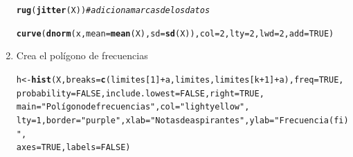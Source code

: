 \documentclass[12pt,letterpaper]{article}\usepackage[]{graphicx}\usepackage[]{color}
\makeatletter
\newcommand{\hlnum}[1]{\textcolor[rgb]{0.686,0.059,0.569}{#1}}%
\newcommand{\hlstr}[1]{\textcolor[rgb]{0.192,0.494,0.8}{#1}}%
\newcommand{\hlcom}[1]{\textcolor[rgb]{0.678,0.584,0.686}{\textit{#1}}}%
\newcommand{\hlopt}[1]{\textcolor[rgb]{0,0,0}{#1}}%
\newcommand{\hlstd}[1]{\textcolor[rgb]{0.345,0.345,0.345}{#1}}%
\newcommand{\hlkwb}[1]{\textcolor[rgb]{0.69,0.353,0.396}{#1}}%
\newcommand{\hlkwc}[1]{\textcolor[rgb]{0.333,0.667,0.333}{#1}}%
\newcommand{\hlkwd}[1]{\textcolor[rgb]{0.737,0.353,0.396}{\textbf{#1}}}%
\newenvironment{kframe}{%
 \def\at@end@of@kframe{}%
 \ifinner\ifhmode%
  \def\at@end@of@kframe{\end{minipage}}%
  \begin{minipage}{\columnwidth}%
 \fi\fi%
 \def\FrameCommand##1{\hskip\@totalleftmargin \hskip-\fboxsep
 \colorbox{shadecolor}{##1}\hskip-\fboxsep
     \hskip-\linewidth \hskip-\@totalleftmargin \hskip\columnwidth}%
 \MakeFramed {\advance\hsize-\width
   \@totalleftmargin\z@ \linewidth\hsize
   \@setminipage}}%
 {\par\unskip\endMakeFramed%
 \at@end@of@kframe}
\newenvironment{knitrout}{}{} %
\makeatother
\begin{document}
\begin{enumerate}
\begin{knitrout}
\begin{kframe}
{\ttfamily\noindent\bfseries{}}\begin{alltt}
\hlkwd{rug}\hlstd{(}\hlkwd{jitter}\hlstd{(X))} \hlcom{# adiciona marcas de los datos }
\end{alltt}


{\ttfamily\noindent\color{warningcolor}{\#\# Warning in rug(jitter(X)): some values will be clipped}}

{\ttfamily\noindent\bfseries\color{errorcolor}{\#\# Error in axis(side = side, at = at, labels = labels, ...): plot.new has not been called yet}}\begin{alltt}
\hlkwd{curve}\hlstd{(}\hlkwd{dnorm}\hlstd{(x,} \hlkwc{mean}\hlstd{=}\hlkwd{mean}\hlstd{(X),} \hlkwc{sd}\hlstd{=}\hlkwd{sd}\hlstd{(X)),} \hlkwc{col} \hlstd{=} \hlnum{2}\hlstd{,} \hlkwc{lty} \hlstd{=} \hlnum{2}\hlstd{,}\hlkwc{lwd} \hlstd{=} \hlnum{2}\hlstd{,} \hlkwc{add} \hlstd{=} \hlnum{TRUE}\hlstd{)}
\end{alltt}


{\ttfamily\noindent\bfseries\color{errorcolor}{\#\# Error in plot.xy(xy.coords(x, y), type = type, ...): plot.new has not been called yet}}\end{kframe}
\end{knitrout}

\item Crea el pol\'igono de frecuencias
\begin{knitrout}
\color{fgcolor}\begin{kframe}
\begin{alltt}
\hlstd{h}\hlkwb{<-} \hlkwd{hist}\hlstd{(X,} \hlkwc{breaks}\hlstd{=}\hlkwd{c}\hlstd{(limites[}\hlnum{1}\hlstd{]}\hlopt{+}\hlstd{a, limites, limites[k}\hlopt{+}\hlnum{1}\hlstd{]}\hlopt{+}\hlstd{a),} \hlkwc{freq} \hlstd{=}\hlnum{TRUE}\hlstd{,}
          \hlkwc{probability}\hlstd{=}\hlnum{FALSE} \hlstd{,} \hlkwc{include.lowest}\hlstd{=}\hlnum{FALSE} \hlstd{,} \hlkwc{right}\hlstd{=}\hlnum{TRUE}\hlstd{,}
\hlkwc{main} \hlstd{=} \hlstr{"Polígono de frecuencias"}\hlstd{,}\hlkwc{col}\hlstd{=}\hlstr{"lightyellow"}\hlstd{,}
\hlkwc{lty}\hlstd{=}\hlnum{1}\hlstd{,} \hlkwc{border} \hlstd{=} \hlstr{"purple"} \hlstd{,} \hlkwc{xlab}\hlstd{=}\hlstr{" Notas de aspirantes"} \hlstd{,} \hlkwc{ylab}\hlstd{=}\hlstr{"Frecuencia (fi)"}\hlstd{,}
\hlkwc{axes}\hlstd{=}\hlnum{TRUE}\hlstd{,} \hlkwc{labels}\hlstd{=}\hlnum{FALSE}\hlstd{)}
\end{alltt}



\end{kframe}
\end{knitrout}
\end{enumerate}
\end{document}
